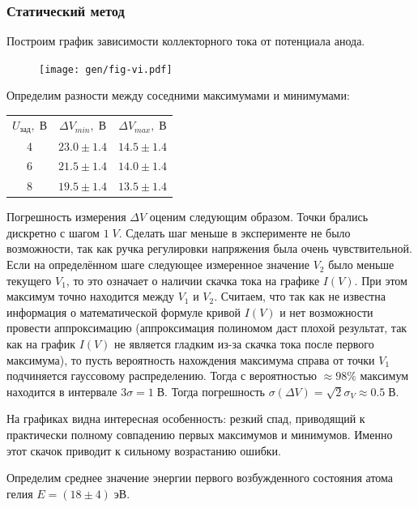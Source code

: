 \documentclass[10pt,a4paper]{article}
\newcommand{\V}{\; В}
\begin{document}
	\subsubsection*{Статический метод}
	
	Построим график зависимости коллекторного тока от потенциала анода.
	
	\begin{figure}[h]
		\centering
		\texttt{[image: gen/fig-vi.pdf]}		
	\end{figure}
	
	Определим разности между соседними максимумами и минимумами: \\
	\begin{center}
		\begin{tabular}{|c|c|c|}
			$U_{зад}, \V$ & $\Delta V_{min}, \V$ & $\Delta V_{max}, \V$ \\
			4 & $23.0 \pm 1.4$ & $14.5 \pm 1.4$ \\
			6 & $21.5 \pm 1.4$ & $14.0 \pm 1.4$ \\
			8 & $19.5 \pm 1.4$ & $13.5 \pm 1.4$ \\
		\end{tabular}
	\end{center}

	Погрешность измерения $\Delta V$ оценим следующим образом. Точки брались дискретно с шагом $1 \; V$. Сделать шаг меньше в эксперименте не было возможности, так как ручка регулировки напряжения была очень чувствительной. Если на определённом шаге следующее измеренное значение $V_2$ было меньше текущего $V_1$, то это означает о наличии скачка тока на графике $I(V)$. При этом максимум точно находится между $V_1$ и $V_2$. Считаем, что так как не известна информация о математической формуле кривой $I(V)$ и нет возможности провести аппроксимацию (аппроксимация полиномом даст плохой результат, так как на график $I(V)$ не является гладким из-за скачка тока после первого максимума), то пусть вероятность нахождения максимума справа от точки $V_1$ подчиняется гауссовому распределению. Тогда с вероятностью $\approx 98 \%$ максимум находится в интервале $3\sigma = 1 \V$. Тогда погрешность $\sigma(\Delta V) = \sqrt{2} \sigma_V \approx 0.5 \V$.
	
	На графиках видна интересная особенность: резкий спад, приводящий к практически полному совпадению первых максимумов и минимумов. Именно этот скачок приводит к сильному возрастанию ошибки.
	
	Определим среднее значение энергии первого возбужденного состояния атома гелия $E = (18 \pm 4) \; эВ$.
	
\end{document}
